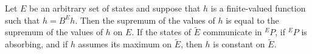 Let $E$ be an arbitrary set of states and suppose that $h$ is a finite-valued function such that $h = B^E h$. Then the supremum of the values of $h$ is equal to the supremum of the values of $h$ on $E$. If the states of $\tilde{E}$ communicate in $^E P$, if $^E P$ is absorbing, and if $h$ assumes its maximum on $\tilde{E}$, then $h$ is constant on $\tilde{E}$.
